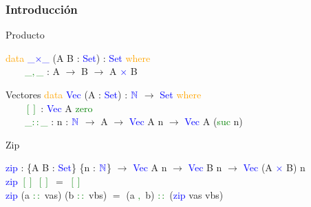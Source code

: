 \documentclass[xcolor=dvipsnames]{beamer} %
\newcommand{\cf}[1]{\textcolor{blue}{#1}}
\newcommand{\ct}[1]{\textcolor{blue}{#1}}
\newcommand{\cc}[1]{\textcolor{green}{#1}}
\newcommand{\ck}[1]{\textcolor{orange}{#1}}
\newcommand{\N}{\ct{\mathbb{N}}}
\newcommand{\ra}{\rightarrow}
\newcommand{\T}{ \ \ \ \ }
\begin{document}
\begin{frame}
\frametitle{Introducci\'on}

\begin{block}{Producto}

\ck{data} \ct{\_$\times$\_} (A B : \ct{Set}) : \ct{Set} \ck{where}\\
\ \ \ \ \cc{\_$,$\_} : A $\ra$ B $\ra$ A \ct{$\times$} B

\end{block}

\pause

\begin{block}{Vectores}
\ck{data} \ct{Vec} (A : \ct{Set}) : $\N$ $\ra$ \ct{Set} \ck{where}\\
\T \cc{$[]$}     : \ct{Vec} A \cc{zero}\\
\T \cc{\_$::$\_} : {n : $\N$} $\ra$ A $\ra$ \ct{Vec} A n $\ra$ \ct{Vec} A (\cc{suc} n)
\end{block}

\pause

\begin{block}{Zip}

\cf{zip} : \{A B : \ct{Set}\} \{n : $\N$\} $\ra$ 
\ct{Vec} A n $\ra$ \ct{Vec} B n $\ra$ \ct{Vec} (A \ct{$\times$} B) n\\
\cf{zip} \cc{$[]$} \cc{$[]$} $=$ \cc{$[]$}\\
\cf{zip} (a \cc{$::$} vas) (b \cc{$::$} vbs) $=$ (a \cc{$,$} b) \cc{$::$} (\cf{zip} vas vbs)

\end{block}

\end{frame}
\end{document}
